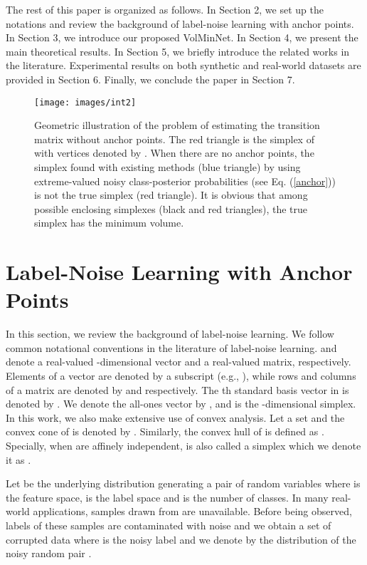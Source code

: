\documentclass{article}
\begin{document}
The rest of this paper is organized as follows. In Section 2, we set up the notations and review the background of label-noise learning with anchor points. In Section 3, we introduce our proposed VolMinNet. In Section 4, we present the main theoretical results. In Section 5, we briefly introduce the related works in the literature. Experimental results on both synthetic and real-world datasets are provided in Section 6. Finally, we conclude the paper in Section 7.

\begin{figure}
\centering
\texttt{[image: images/int2]}
\caption{Geometric illustration of the problem of estimating the transition matrix without anchor points. The red triangle is the simplex of  with vertices denoted by . When there are no anchor points, the simplex found with existing methods (blue triangle) by using extreme-valued noisy class-posterior probabilities (see Eq. (\ref{anchor})) is not the true simplex (red triangle). It is obvious that among possible enclosing simplexes (black and red triangles), the true simplex  has the minimum volume.}
\label{volmin_intuition}
\vspace{-14pt}
\end{figure}




\section{Label-Noise Learning with Anchor Points}




In this section, we review the background of label-noise learning. We follow common notational conventions in the literature of label-noise learning.  and  denote a real-valued -dimensional vector and a real-valued  matrix, respectively. Elements of a vector are denoted by a subscript (e.g., ), while rows and columns of a matrix are denoted by  and  respectively. The th standard basis vector in  is denoted by . We denote the all-ones vector by , and  is the -dimensional simplex. In this work, we also make extensive use of convex analysis. Let a set  and the convex cone of  is denoted by . Similarly, the convex hull of  is defined as  . Specially, when  are affinely independent,  is also called a simplex which we denote it as .



Let   be the underlying distribution generating a pair of random variables  where  is the feature space,  is the label space and  is the number of classes. In many real-world applications, samples drawn from  are unavailable. Before being observed, labels of these samples are contaminated with noise and we obtain a set of corrupted data  where  is the noisy label and we denote by  the distribution of the noisy random pair . 
\end{document}
